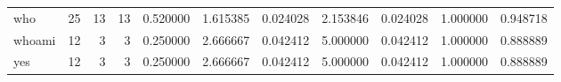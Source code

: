 \begin{longtable}{lrrrrrrrrrr}
who       &                                      25 &                 13 &                                13 &                                   0.520000 &                               1.615385 &                                     0.024028 &                          2.153846 &                                0.024028 &                           1.000000 &                                           0.948718 \\
whoami    &                                      12 &                  3 &                                 3 &                                   0.250000 &                               2.666667 &                                     0.042412 &                          5.000000 &                                0.042412 &                           1.000000 &                                           0.888889 \\
yes       &                                      12 &                  3 &                                 3 &                                   0.250000 &                               2.666667 &                                     0.042412 &                          5.000000 &                                0.042412 &                           1.000000 &                                           0.888889 \\
\end{longtable}
